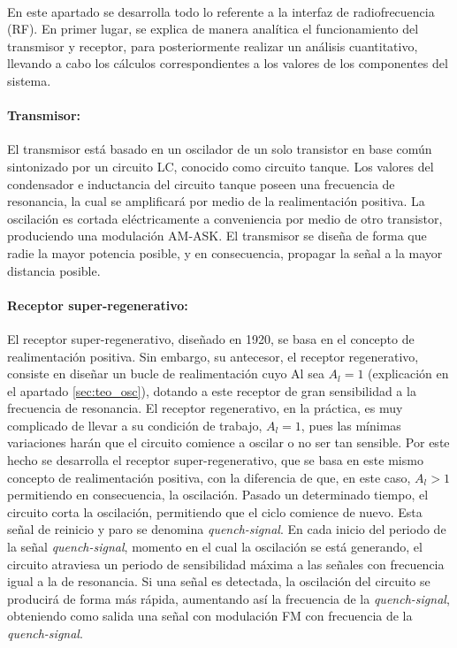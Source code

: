 \paragraph{} En este apartado se desarrolla todo lo referente a la interfaz de radiofrecuencia (RF). En primer lugar, se explica de manera analítica el funcionamiento del transmisor y receptor, para posteriormente realizar un análisis cuantitativo, llevando a cabo los cálculos correspondientes a los valores de los componentes del sistema.

\paragraph{Transmisor:} El transmisor está basado en un oscilador de un solo transistor en base com\'un sintonizado por un circuito LC, conocido como circuito tanque.
Los valores del condensador e inductancia del circuito tanque poseen una frecuencia de resonancia, la cual se amplificar\'a por medio de la realimentación positiva. La oscilación es cortada eléctricamente a conveniencia por medio de otro transistor, produciendo una modulación AM-ASK. El transmisor se diseña de forma que radie la mayor potencia posible, y en consecuencia, propagar la señal a la mayor distancia posible.

\paragraph{Receptor super-regenerativo:} El receptor super-regenerativo, diseñado en 1920, se basa en el concepto de realimentación positiva. Sin embargo, su antecesor, el receptor regenerativo, consiste en diseñar un bucle de realimentación cuyo Al sea $A_l = 1$ (explicaci\'on en el apartado \ref{sec:teo_osc}), dotando a este receptor de gran sensibilidad a la frecuencia de resonancia. 
El receptor regenerativo, en la práctica, es muy complicado de llevar a su condici\'on de trabajo, $A_l = 1$, pues las mínimas variaciones harán que el circuito comience a oscilar o no ser tan sensible. Por este hecho se desarrolla el receptor super-regenerativo, que se basa en este mismo concepto de realimentación positiva, con la diferencia de que, en este caso, $A_l > 1$ permitiendo en consecuencia, la oscilaci\'on. Pasado un determinado tiempo, el circuito corta la oscilación, permitiendo que el ciclo comience de nuevo. Esta señal de reinicio y paro se denomina \textit{quench-signal}. En cada inicio del periodo de la señal \textit{quench-signal}, momento en el cual la oscilación se está generando, el circuito atraviesa un periodo de sensibilidad máxima a las señales con frecuencia igual a la de resonancia. Si una señal es detectada, la oscilación del circuito se producirá de forma más rápida, aumentando así la frecuencia de la \textit{quench-signal}, obteniendo como salida una señal con modulación FM con frecuencia de la \textit{quench-signal}.

